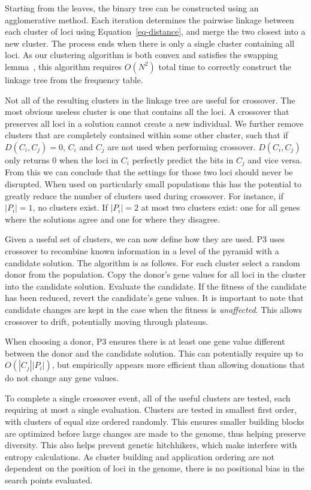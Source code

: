 \documentclass{sig-alternate}
\begin{document}
Starting from the leaves, the binary tree can be constructed using an
agglomerative method.  Each
iteration determines the pairwise linkage between each cluster of loci
using Equation~\ref{eq-distance}, and merge the two closest into a new
cluster.  The process ends when there is only a single cluster
containing all loci.  As our clustering algorithm is both convex and
satisfies the swapping lemma~\cite{gronau:2007:upgma}, this algorithm
requires $O(N^2)$ total time to correctly construct the linkage tree
from the frequency table.

Not all of  the resulting clusters in the linkage  tree are useful for
crossover.  The most obvious useless  cluster is one that contains all
the loci.   A crossover that preserves  all loci in  a solution cannot
create  a  new  individual.   We  further  remove  clusters  that  are
completely  contained   within  some  other  cluster,   such  that  if
$D(C_i,C_j)  =  0$, $C_i$  and  $C_j$  are  not used  when  performing
crossover.   $D(C_i,C_j)$ only  returns  $0$ when  the  loci in  $C_i$
perfectly predict the  bits in $C_j$ and vice versa. From this we can
conclude  that  the  settings  for  those two  loci  should  never  be
disrupted.  When  used on particularly small populations  this has the
potential  to  greatly  reduce  the  number of  clusters  used  during
crossover.  For  instance, if  $|P_i| = 1$,  no clusters exist. If
$|P_i| =  2$ at most two clusters  exist: one for all  genes where the
solutions agree and one for where they disagree.

Given a useful set of clusters, we can now define how they are used.
P3 uses crossover to recombine known information in a level of the
pyramid with a candidate solution.  The algorithm is as follows. For
each cluster select a random donor from the population.  Copy the
donor's gene values for all loci in the cluster into the candidate
solution.  Evaluate the candidate.  If the fitness of the candidate
has been reduced, revert the candidate's gene values.  It is important
to note that candidate changes are kept in the case when the fitness
is \emph{unaffected}.  This allows crossover to drift, potentially
moving through plateaus.

When choosing a donor, P3 ensures there is at least one gene value
different between the donor and the candidate solution.  This can
potentially require up to $O(|C_j||P_i|)$, but empirically appears
more efficient than allowing donations that do not change any gene
values.

To complete a single crossover event, all of the useful clusters are tested, each
requiring at most a single evaluation.  Clusters are tested in smallest first order,
with clusters of equal size ordered randomly.  This ensures smaller building blocks
are optimized before large changes are made to the genome, thus helping preserve
diversity.  This also helps prevent genetic hitchhikers, which make interfere with
entropy calculations.  As cluster building and application ordering are not dependent on
the position of loci in the genome, there is no positional bias in the search points
evaluated.
\end{document}
